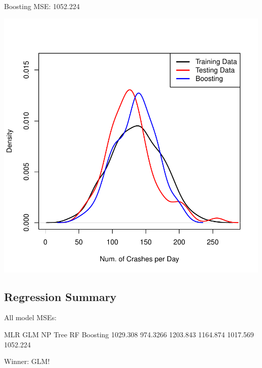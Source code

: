 \documentclass[11pt, a4paper]{article}
\begin{document}
\begin{Schunk}
\begin{Soutput}
Boosting MSE: 1052.224
\end{Soutput}
\end{Schunk}
\includegraphics{regression-027}







\pagebreak
\subsection{Regression Summary}


\begin{Schunk}
\begin{Soutput}
All model MSEs:
\end{Soutput}
\begin{Soutput}
      MLR      GLM       NP     Tree       RF Boosting
 1029.308 974.3266 1203.843 1164.874 1017.569 1052.224
\end{Soutput}
\end{Schunk}


\vspace{6pc}

Winner: GLM!
\end{document}
